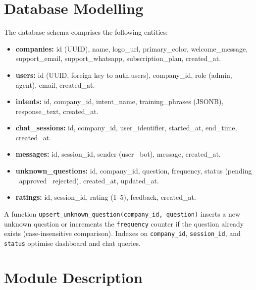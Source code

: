 \documentclass[12pt,a4paper]{report}
\begin{document}
\section{Database Modelling}

The database schema comprises the following entities:

\begin{itemize}
  \item \textbf{companies:} id (UUID), name, logo\_url, primary\_color, welcome\_message, support\_email, support\_whatsapp, subscription\_plan, created\_at.
  \item \textbf{users:} id (UUID, foreign key to auth.users), company\_id, role (admin, agent), email, created\_at.
  \item \textbf{intents:} id, company\_id, intent\_name, training\_phrases (JSONB), response\_text, created\_at.
  \item \textbf{chat\_sessions:} id, company\_id, user\_identifier, started\_at, end\_time, created\_at.
  \item \textbf{messages:} id, session\_id, sender (user \textbar\ bot), message, created\_at.
  \item \textbf{unknown\_questions:} id, company\_id, question, frequency, status (pending \textbar\ approved \textbar\ rejected), created\_at, updated\_at.
  \item \textbf{ratings:} id, session\_id, rating (1--5), feedback, created\_at.
\end{itemize}

A function \texttt{upsert\_unknown\_question(company\_id, question)} inserts a new unknown question or increments the \texttt{frequency} counter if the question already exists (case-insensitive comparison). Indexes on \texttt{company\_id}, \texttt{session\_id}, and \texttt{status} optimise dashboard and chat queries.

\section{Module Description}
\end{document}
